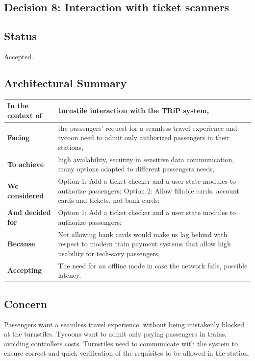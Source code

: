 \subsection{Decision 8: Interaction with ticket scanners}

\subsection*{Status}
Accepted.

\subsection*{Architectural Summary}
\begin{tabular}{|p{3.5cm}|p{10.5cm}|}
    \hline
    \textbf{In the context of} & turnstile interaction with the TRiP system, \\
    \hline
    \textbf{Facing} & the passengers' request for a seamless travel experience and tycoon need to admit only authorized passengers in their stations, \\
    \hline
    \textbf{To achieve} & high availability, security in sensitive data communication, many options adapted to different passengers needs, \\
    \hline
    \textbf{We considered} & Option 1: Add a ticket checker and a user state modules to authorize passengers; Option 2: Allow fillable cards, account cards and tickets, not bank cards;\\
    \hline
    \textbf{And decided for} & Option 1: Add a ticket checker and a user state modules to authorize passengers;\\
    \hline
    \textbf{Because} & Not allowing bank cards would make us lag behind with respect to modern train payment systems that allow high usability for tech-savy passengers, \\
    \hline
    \textbf{Accepting} & The need for an offline mode in case the network fails, possible latency. \\
    \hline
\end{tabular}
\subsection*{Concern}
Passengers want a seamless travel experience, without being mistakenly blocked at the turnstiles.
Tycoons want to admit only paying passengers in trains, avoiding controllers costs.
Turnstiles need to communicate with the system to ensure correct and quick verification of the requisites to be allowed in the station.

